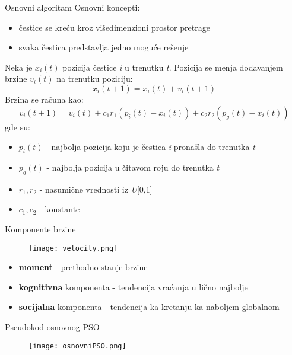 \documentclass{beamer}
\begin{document}
\begin{frame}{Osnovni algoritam}
Osnovni koncepti:
\begin{itemize}
    \item čestice se kreću kroz višedimenzioni prostor pretrage
    \item svaka čestica predstavlja jedno moguće rešenje
\end{itemize}

Neka je $x_i(t)$ pozicija čestice \textit{i} u trenutku \textit{t}. Pozicija se menja dodavanjem brzine $v_i(t)$ na trenutku poziciju:
\[ x_i(t+1) = x_i(t) + v_i(t+1) \]
Brzina se računa kao:
\[ v_i(t+1) = v_i(t) + c_1r_1(p_i(t) - x_i(t)) + c_2r_2(p_g(t) - x_i(t))\] gde su:

\begin{itemize}
    \item $p_i(t)$ - najbolja pozicija koju je čestica \textit{i} pronašla do trenutka \textit{t}
    \item $p_g(t)$ - najbolja pozicija u čitavom roju do trenutka \textit{t}
    \item $r_1, r_2$ - nasumične vrednosti iz \textit{U}[0,1]
    \item $c_1, c_2$ - konstante
\end{itemize}

\end{frame}


\begin{frame}{Komponente brzine}
    \begin{figure}[htp]
    \centering
    \texttt{[image: velocity.png]}
    
\end{figure}

\begin{itemize}
    \item \textbf{moment} - prethodno stanje brzine
    \item \textbf{kognitivna} komponenta - tendencija vraćanja u lično najbolje
    \item \textbf{socijalna} komponenta - tendencija ka kretanju ka naboljem globalnom
\end{itemize}
\end{frame}


\begin{frame}{Pseudokod osnovnog PSO}
    
    \begin{figure}[htp]
    \centering
    \texttt{[image: osnovniPSO.png]}
    
\end{figure}  
    
\end{frame}
\end{document}
